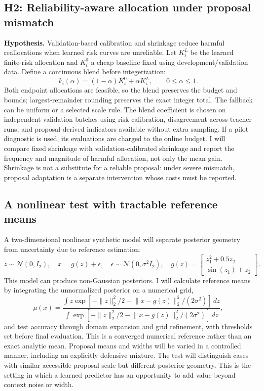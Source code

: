 \documentclass[11pt,letterpaper]{article}
\newcommand{\N}{\mathcal N}
\newcommand{\norm}[1]{\lVert #1\rVert_2}
\begin{document}
\subsection{H2: Reliability-aware allocation under proposal mismatch}
\textbf{Hypothesis.} Validation-based calibration and shrinkage reduce harmful reallocations when learned risk curves are unreliable. Let $K_i^L$ be the learned finite-risk allocation and $K_i^0$ a cheap baseline fixed using development/validation data. Define a continuous blend before integerization:
\begin{equation}
 k_i(\alpha)=(1-\alpha)K_i^0+\alpha K_i^L,\qquad 0\leq\alpha\leq1.
\end{equation}
Both endpoint allocations are feasible, so the blend preserves the budget and bounds; largest-remainder rounding preserves the exact integer total. The fallback can be uniform or a selected scale rule. The blend coefficient is chosen on independent validation batches using risk calibration, disagreement across teacher runs, and proposal-derived indicators available without extra sampling. If a pilot diagnostic is used, its evaluations are charged to the online budget. I will compare fixed shrinkage with validation-calibrated shrinkage and report the frequency and magnitude of harmful allocation, not only the mean gain. Shrinkage is not a substitute for a reliable proposal: under severe mismatch, proposal adaptation is a separate intervention whose costs must be reported.
\clearpage
\subsection{A nonlinear test with tractable reference means}
A two-dimensional nonlinear synthetic model will separate posterior geometry from uncertainty due to reference estimation:
\begin{equation}
 z\sim\N(0,I_2),\quad x=g(z)+\epsilon,\quad \epsilon\sim\N(0,\sigma^2 I_2),\quad
 g(z)=\begin{bmatrix}z_1^2+0.5z_2\\\sin(z_1)+z_2\end{bmatrix}.
\end{equation}
This model can produce non-Gaussian posteriors. I will calculate reference means by integrating the unnormalized posterior on a numerical grid,
\begin{equation}
 \mu(x)=\frac{\int z\exp[-\norm z^2/2-\norm{x-g(z)}^2/(2\sigma^2)]\,dz}
 {\int\exp[-\norm z^2/2-\norm{x-g(z)}^2/(2\sigma^2)]\,dz},
\end{equation}
and test accuracy through domain expansion and grid refinement, with thresholds set before final evaluation. This is a converged numerical reference rather than an exact analytic mean. Proposal means and widths will be varied in a controlled manner, including an explicitly defensive mixture. The test will distinguish cases with similar accessible proposal scale but different posterior geometry. This is the setting in which a learned predictor has an opportunity to add value beyond context noise or width.
\end{document}
